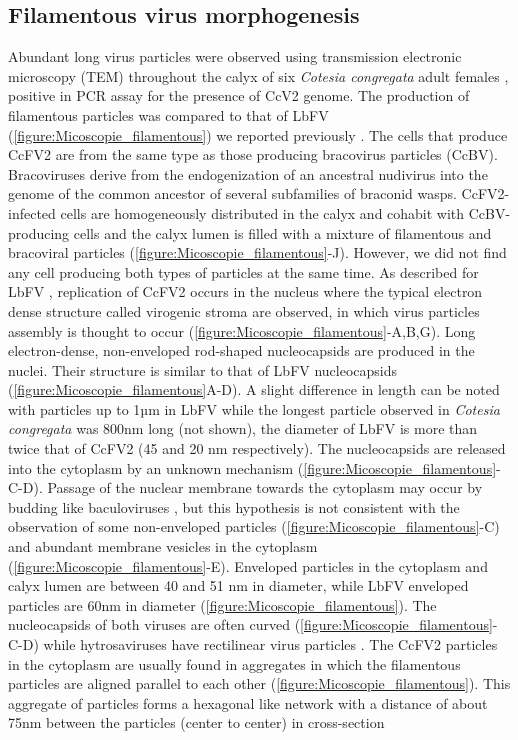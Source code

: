 \subsection{Filamentous virus morphogenesis}

Abundant long virus particles were observed using transmission electronic microscopy (TEM) throughout the calyx of six \textit{Cotesia congregata} adult females \citep{bredlau_parasitic_2019}, positive in PCR assay for the presence of CcV2 genome. The production of filamentous particles was compared to that of LbFV (\figurename{\ref{figure:Micoscopie_filamentous}}) we reported previously \citep{varaldi_infectious_2003, varaldi_artifical_2006}. The cells that produce CcFV2 are from the same type as those producing bracovirus particles (CcBV). Bracoviruses derive from the endogenization of an ancestral  nudivirus  into the genome of the common ancestor of several subfamilies of braconid wasps. CcFV2-infected cells are homogeneously distributed in the calyx and cohabit with CcBV-producing cells and the calyx lumen is filled with a mixture of filamentous and bracoviral particles (\figurename{\ref{figure:Micoscopie_filamentous}}-J). However, we did not find any cell producing both types of particles at the same time. As described for LbFV  \citep{varaldi_artifical_2006}, replication of CcFV2 occurs in the nucleus where the typical electron dense structure called virogenic stroma are observed, in which virus particles assembly is thought to occur (\figurename{\ref{figure:Micoscopie_filamentous}}-A,B,G). Long electron-dense, non-enveloped rod-shaped nucleocapsids are produced in the nuclei. Their structure is similar to that of LbFV nucleocapsids (\figurename{\ref{figure:Micoscopie_filamentous}}A-D). A slight difference in length can be noted with particles up to 1µm in LbFV \citep{varaldi_artifical_2006} while the longest particle observed in \textit{Cotesia congregata} was 800nm long (not shown), the diameter of LbFV is more than twice that of CcFV2 (45 and 20 nm respectively). The nucleocapsids are released into the cytoplasm by an unknown mechanism (\figurename{\ref{figure:Micoscopie_filamentous}}-C-D). Passage of the nuclear membrane towards the cytoplasm may occur by budding like baculoviruses \citep{granados_vivo_1981}, but this hypothesis is not consistent with the observation of some non-enveloped particles (\figurename{\ref{figure:Micoscopie_filamentous}}-C) and abundant membrane vesicles in the cytoplasm (\figurename{\ref{figure:Micoscopie_filamentous}}-E). Enveloped particles in the cytoplasm and calyx lumen are between 40 and 51 nm in diameter, while LbFV enveloped particles are 60nm in diameter (\figurename{\ref{figure:Micoscopie_filamentous}}). The nucleocapsids of both viruses are often curved (\figurename{\ref{figure:Micoscopie_filamentous}}-C-D) while hytrosaviruses  have  rectilinear virus particles \citep{abd-alla_genome_2008}. The CcFV2 particles in the cytoplasm are usually found in aggregates in which the filamentous particles are aligned parallel to each other (\figurename{\ref{figure:Micoscopie_filamentous}}). This aggregate of particles forms a hexagonal like network with a distance of about 75nm between the particles (center to center) in cross-section 